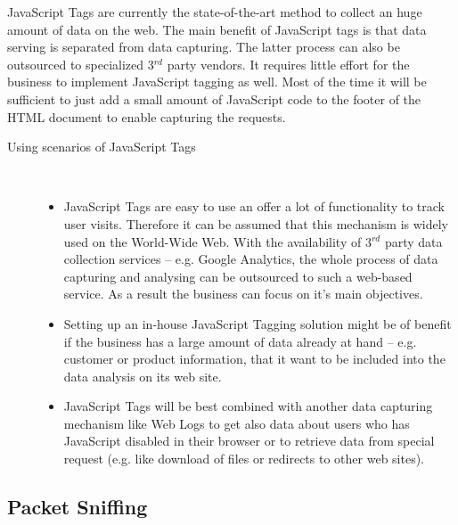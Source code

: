 JavaScript Tags are currently the state-of-the-art method to collect an huge amount of data on the web. The main benefit of JavaScript tags is that data serving is separated from data capturing. The latter process can also be outsourced to specialized 3$^{rd}$ party vendors. It requires little effort for the business to implement JavaScript tagging as well. Most of the time it will be sufficient to just add a small amount of JavaScript code to the footer of the HTML document to enable capturing the requests.
\citep[p. 30-33]{Kaushik07}
\begin{description}
	\item[Using scenarios of JavaScript Tags]~\par
    \begin{itemize}
   		\item JavaScript Tags are easy to use an offer a lot of functionality to track user visits. Therefore it can be assumed that this mechanism is widely used on the World-Wide Web. With the availability of 3$^{rd}$ party data collection services -- e.g. Google Analytics, the whole process of data capturing and analysing can be outsourced to such a web-based service. As a result the business can focus on it's main objectives.
        \item Setting up an in-house JavaScript Tagging solution might be of benefit if the business has a large amount of data already at hand -- e.g. customer or product information, that it want to be included into the data analysis on its web site.
        \item JavaScript Tags will be best combined with another data capturing mechanism like Web Logs to  get also data about users who has JavaScript disabled in their browser or to retrieve data from special request (e.g. like download of files or redirects to other web sites).
    \end{itemize}
\end{description}

\subsection{Packet Sniffing} %
\label{sub:packet_sniffing}

